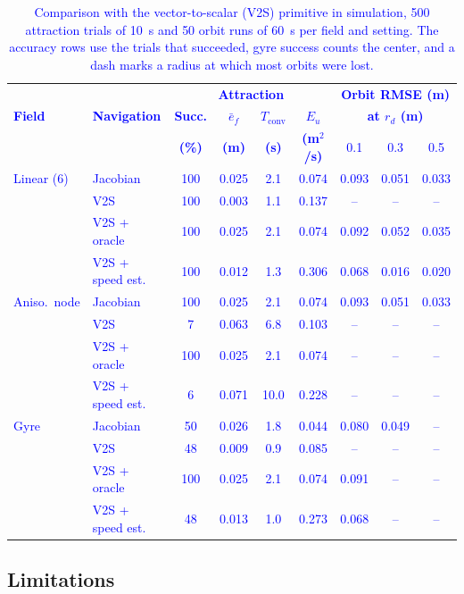 \documentclass[lettersize,journal]{IEEEtran}
\newcommand{\newnum}[1]{\textcolor{blue}{#1}}
\begin{document}
\begin{table}[!t]
\centering
\scriptsize
\caption{Comparison with the vector-to-scalar (V2S) primitive in simulation, \newnum{500} attraction trials of 10~s and \newnum{50} orbit runs of 60~s per field and setting. The accuracy rows use the trials that succeeded, gyre success counts the center, and a dash marks a radius at which most orbits were lost.}
\label{tab:baselines}
\setlength{\tabcolsep}{1.8pt}
\newnum{\begin{tabular}{ll|cccc|ccc}
\hline
 & & \multicolumn{4}{c|}{\textbf{Attraction}} & \multicolumn{3}{c}{\textbf{Orbit RMSE (m)}} \\
\textbf{Field} & \textbf{Navigation} & \textbf{Succ.} & \textbf{$\bar{e}_f$} & \textbf{$T_{\mathrm{conv}}$} & \textbf{$E_u$} & \multicolumn{3}{c}{\textbf{at $r_d$ (m)}} \\
 & & \textbf{(\%)} & \textbf{(m)} & \textbf{(s)} & \textbf{(m$^2$/s)} & 0.1 & 0.3 & 0.5 \\
\hline
Linear (6) & Jacobian & 100 & 0.025 & 2.1 & 0.074 & 0.093 & 0.051 & 0.033 \\
 & V2S & 100 & 0.003 & 1.1 & 0.137 & -- & -- & -- \\
 & V2S + oracle & 100 & 0.025 & 2.1 & 0.074 & 0.092 & 0.052 & 0.035 \\
 & V2S + speed est. & 100 & 0.012 & 1.3 & 0.306 & 0.068 & 0.016 & 0.020 \\
\hline
Aniso.\ node & Jacobian & 100 & 0.025 & 2.1 & 0.074 & 0.093 & 0.051 & 0.033 \\
 & V2S & 7 & 0.063 & 6.8 & 0.103 & -- & -- & -- \\
 & V2S + oracle & 100 & 0.025 & 2.1 & 0.074 & -- & -- & -- \\
 & V2S + speed est. & 6 & 0.071 & 10.0 & 0.228 & -- & -- & -- \\
\hline
Gyre & Jacobian & 50 & 0.026 & 1.8 & 0.044 & 0.080 & 0.049 & -- \\
 & V2S & 48 & 0.009 & 0.9 & 0.085 & -- & -- & -- \\
 & V2S + oracle & 100 & 0.025 & 2.1 & 0.074 & 0.091 & -- & -- \\
 & V2S + speed est. & 48 & 0.013 & 1.0 & 0.273 & 0.068 & -- & -- \\
\hline
\end{tabular}}
\end{table}

\subsection{Limitations}
\end{document}
